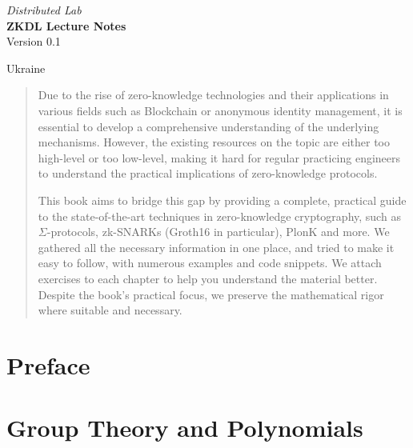 \documentclass{zkdl-template}
\def\maketitle{
    \begin{center}
        {\Large\sffamily \emph{Distributed Lab}} \\ \vspace{30mm}
        {\huge\sffamily\bfseries ZKDL Lecture Notes} \\ \vspace{5mm}
        {Version 0.1} \\ \vspace{10mm}
    \end{center}
    
    \vfill

    \begin{center}
        {Ukraine} \\ \vspace{2mm}
        {\sffamily \the\year}
    \end{center}

    \thispagestyle{empty}
    \pagebreak
}
\begin{document}
    \maketitle

    \pagecolor{white}
    
    \begin{abstract}
        \fontsize{10}{12}\selectfont
        Due to the rise of zero-knowledge technologies and their applications in
        various fields such as Blockchain or anonymous identity management, it is
        essential to develop a comprehensive understanding of the underlying
        mechanisms. However, the existing resources on the topic are either too
        high-level or too low-level, making it hard for regular practicing engineers
        to understand the practical implications of zero-knowledge protocols.
    
        This book aims to bridge this gap by providing a complete, practical guide
        to the state-of-the-art techniques in zero-knowledge cryptography, such as
        $\Sigma$-protocols, zk-SNARKs (Groth16 in particular), PlonK and more. We
        gathered all the necessary information in one place, and tried to make it
        easy to follow, with numerous examples and code snippets. We attach
        exercises to each chapter to help you understand the material better.
        Despite the book's practical focus, we preserve the mathematical rigor where
        suitable and necessary.
    \end{abstract}
    
    \thispagestyle{empty}
    \newpage

    \pagestyle{fancy}
    \pagecolor{white}

    \tableofcontents

\pagebreak


\section*{Preface}



\section{Group Theory and Polynomials}\label{section:math-crypto-1}


\end{document}
